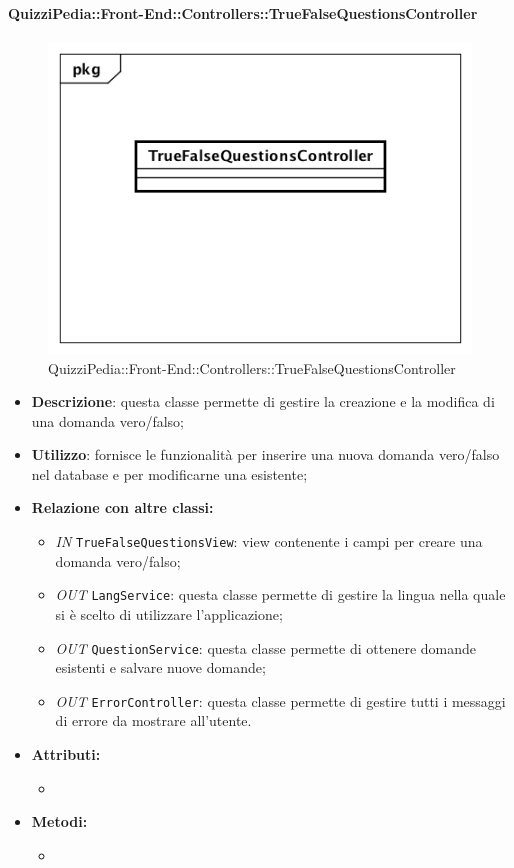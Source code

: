 \paragraph{QuizziPedia::Front-End::Controllers::TrueFalseQuestionsController}
\begin{figure}
	\centering
	\includegraphics[scale=0.45]{UML/Classi/Front-End/QuizziPedia_Front-end_Controller_TrueFalseQuestionsController.png}
	\caption{QuizziPedia::Front-End::Controllers::TrueFalseQuestionsController}
\end{figure}
\begin{itemize}
	\item \textbf{Descrizione}: questa classe permette di gestire la creazione e la modifica di una domanda vero/falso;
	\item \textbf{Utilizzo}: fornisce le funzionalità per inserire una nuova domanda vero/falso nel database e per modificarne una esistente;
	\item \textbf{Relazione con altre classi:}
	\begin{itemize}
		\item \textit{IN} \texttt{TrueFalseQuestionsView}: view contenente i campi per creare una domanda vero/falso;  
		\item \textit{OUT} \texttt{LangService}: questa classe permette di gestire la lingua nella quale si è scelto di utilizzare l'applicazione;
		\item \textit{OUT} \texttt{QuestionService}: questa classe permette di ottenere domande esistenti e salvare nuove domande;
		\item \textit{OUT} \texttt{ErrorController}: questa classe permette di gestire tutti i messaggi di errore da mostrare all'utente.
	\end{itemize}
	\item \textbf{Attributi:}
	\begin{itemize}
		\item 
	\end{itemize}
	\item \textbf{Metodi:}
	\begin{itemize}
		\item 
	\end{itemize}
\end{itemize}

